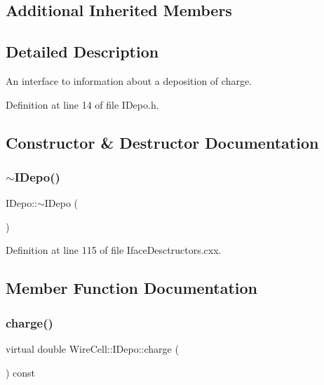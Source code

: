 \subsection*{Additional Inherited Members}


\subsection{Detailed Description}
An interface to information about a deposition of charge. 

Definition at line 14 of file I\+Depo.\+h.



\subsection{Constructor \& Destructor Documentation}
\mbox{\label{class_wire_cell_1_1_i_depo_af4f65a4847ecb15d3c2fc70b017d28e3}} 
\subsubsection{\texorpdfstring{$\sim$\+I\+Depo()}{~IDepo()}}
{\footnotesize\ttfamily I\+Depo\+::$\sim$\+I\+Depo (\begin{DoxyParamCaption}{ }\end{DoxyParamCaption})\hspace{0.3cm}{\ttfamily [virtual]}}



Definition at line 115 of file Iface\+Desctructors.\+cxx.



\subsection{Member Function Documentation}
\mbox{\label{class_wire_cell_1_1_i_depo_a096a0b84b90685700f26950b0523c43c}} 
\subsubsection{\texorpdfstring{charge()}{charge()}}
{\footnotesize\ttfamily virtual double Wire\+Cell\+::\+I\+Depo\+::charge (\begin{DoxyParamCaption}{ }\end{DoxyParamCaption}) const\hspace{0.3cm}{\ttfamily [pure virtual]}}



